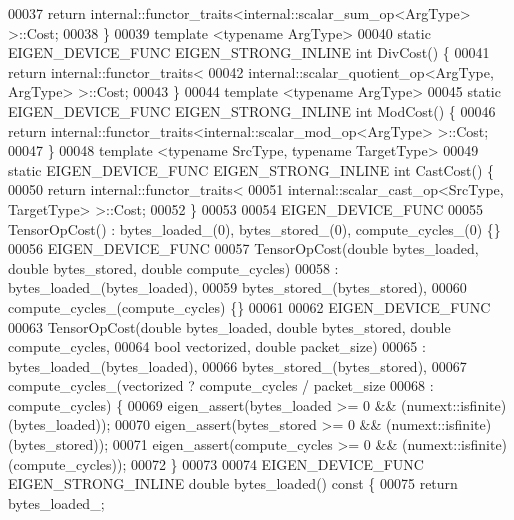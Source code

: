 \begin{DoxyCode}
00037     \textcolor{keywordflow}{return} internal::functor\_traits<internal::scalar\_sum\_op<ArgType> >::Cost;
00038   \}
00039   \textcolor{keyword}{template} <\textcolor{keyword}{typename} ArgType>
00040   \textcolor{keyword}{static} EIGEN\_DEVICE\_FUNC EIGEN\_STRONG\_INLINE \textcolor{keywordtype}{int} DivCost() \{
00041     \textcolor{keywordflow}{return} internal::functor\_traits<
00042         internal::scalar\_quotient\_op<ArgType, ArgType> >::Cost;
00043   \}
00044   \textcolor{keyword}{template} <\textcolor{keyword}{typename} ArgType>
00045   \textcolor{keyword}{static} EIGEN\_DEVICE\_FUNC EIGEN\_STRONG\_INLINE \textcolor{keywordtype}{int} ModCost() \{
00046     \textcolor{keywordflow}{return} internal::functor\_traits<internal::scalar\_mod\_op<ArgType> >::Cost;
00047   \}
00048   \textcolor{keyword}{template} <\textcolor{keyword}{typename} SrcType, \textcolor{keyword}{typename} TargetType>
00049   \textcolor{keyword}{static} EIGEN\_DEVICE\_FUNC EIGEN\_STRONG\_INLINE \textcolor{keywordtype}{int} CastCost() \{
00050     \textcolor{keywordflow}{return} internal::functor\_traits<
00051         internal::scalar\_cast\_op<SrcType, TargetType> >::Cost;
00052   \}
00053 
00054   EIGEN\_DEVICE\_FUNC
00055   TensorOpCost() : bytes\_loaded\_(0), bytes\_stored\_(0), compute\_cycles\_(0) \{\}
00056   EIGEN\_DEVICE\_FUNC
00057   TensorOpCost(\textcolor{keywordtype}{double} bytes\_loaded, \textcolor{keywordtype}{double} bytes\_stored, \textcolor{keywordtype}{double} compute\_cycles)
00058       : bytes\_loaded\_(bytes\_loaded),
00059         bytes\_stored\_(bytes\_stored),
00060         compute\_cycles\_(compute\_cycles) \{\}
00061 
00062   EIGEN\_DEVICE\_FUNC
00063   TensorOpCost(\textcolor{keywordtype}{double} bytes\_loaded, \textcolor{keywordtype}{double} bytes\_stored, \textcolor{keywordtype}{double} compute\_cycles,
00064                \textcolor{keywordtype}{bool} vectorized, \textcolor{keywordtype}{double} packet\_size)
00065       : bytes\_loaded\_(bytes\_loaded),
00066         bytes\_stored\_(bytes\_stored),
00067         compute\_cycles\_(vectorized ? compute\_cycles / packet\_size
00068                                    : compute\_cycles) \{
00069     eigen\_assert(bytes\_loaded >= 0 && (numext::isfinite)(bytes\_loaded));
00070     eigen\_assert(bytes\_stored >= 0 && (numext::isfinite)(bytes\_stored));
00071     eigen\_assert(compute\_cycles >= 0 && (numext::isfinite)(compute\_cycles));
00072   \}
00073 
00074   EIGEN\_DEVICE\_FUNC EIGEN\_STRONG\_INLINE \textcolor{keywordtype}{double} bytes\_loaded()\textcolor{keyword}{ const }\{
00075     \textcolor{keywordflow}{return} bytes\_loaded\_;

\end{DoxyCode}
